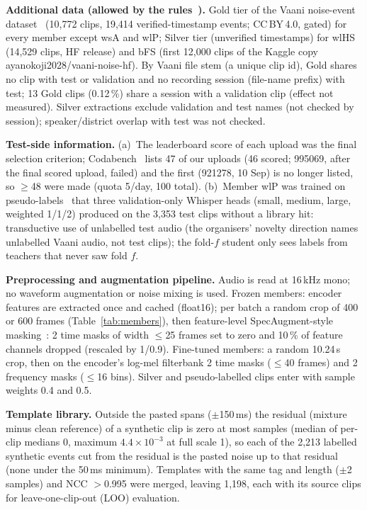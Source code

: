 \documentclass[conference]{IEEEtran}
\begin{document}
\textbf{Additional data (allowed by the rules~\cite{comp}).} Gold tier of the Vaani noise-event
dataset~\cite{vaanids,vaani} (10,772 clips, 19,414 verified-timestamp events; CC\,BY\,4.0, gated) for every member
except wsA and wlP; Silver tier (unverified timestamps) for wlHS (14,529 clips, HF release) and bFS (first 12,000
clips of the Kaggle copy ayanokoji2028/vaani-noise-hf). By Vaani file stem (a unique clip id), Gold shares no clip
with test or validation and no recording session (file-name prefix) with test; 13 Gold clips (0.12\,\%) share a
session with a validation clip (effect not measured). Silver extractions exclude validation and test names (not
checked by session); speaker/district overlap with test was not checked.

\textbf{Test-side information.} (a)~The leaderboard score of each upload was the final selection criterion;
Codabench~\cite{comp} lists 47 of our uploads (46 scored; 995069, after the final scored upload, failed) and the
first (921278, 10 Sep) is no longer listed, so $\ge$48 were made (quota 5/day, 100 total). (b)~Member wlP was
trained on pseudo-labels~\cite{lee} that three validation-only Whisper heads (small, medium, large, weighted
1/1/2) produced on the 3,353 test clips without a library hit: transductive use of unlabelled test audio (the
organisers' novelty direction names unlabelled Vaani audio, not test clips); the fold-$f$ student only sees
labels from teachers that never saw fold $f$.

\textbf{Preprocessing and augmentation pipeline.} Audio is read at 16\,kHz mono; no waveform augmentation or
noise mixing is used. Frozen members: encoder features are extracted once and cached (float16); per batch a random
crop of 400 or 600 frames (Table~\ref{tab:members}), then feature-level SpecAugment-style masking~\cite{specaug}:
2 time masks of width $\le$25 frames set to zero and 10\,\% of feature channels dropped (rescaled by 1/0.9).
Fine-tuned members: a random 10.24\,s crop, then on the encoder's log-mel filterbank 2 time masks ($\le$40 frames)
and 2 frequency masks ($\le$16 bins). Silver and pseudo-labelled clips enter with sample weights 0.4 and 0.5.

\textbf{Template library.} Outside the pasted spans ($\pm$150\,ms) the residual (mixture minus clean reference) of
a synthetic clip is zero at most samples (median of per-clip medians 0, maximum $4.4\!\times\!10^{-3}$ at full
scale 1), so each of the 2,213 labelled synthetic events cut from the residual is the pasted noise up to that
residual (none under the 50\,ms minimum). Templates with the same tag and length ($\pm$2 samples) and NCC $>$0.995
were merged, leaving 1,198, each with its source clips for leave-one-clip-out (LOO) evaluation.
\end{document}
